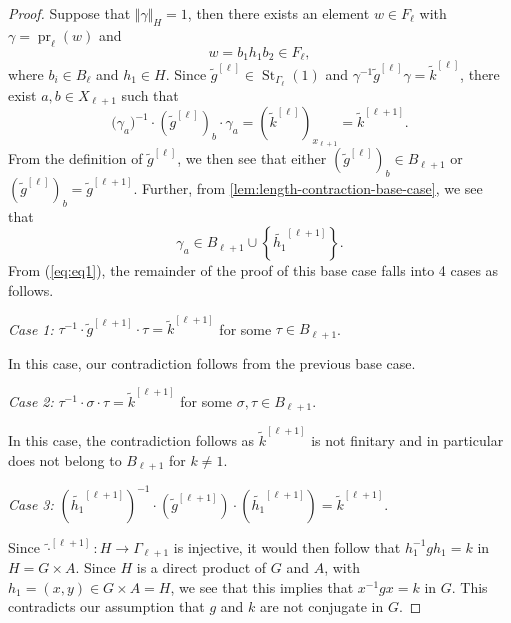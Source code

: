 \documentclass[10pt,a4paper]{amsart}
\DeclareMathOperator{\St}{St}
\DeclareMathOperator{\pr}{pr}
\newcommand{\absH}[1]{\Vert #1 \Vert_H}
\begin{document}
\begin{proof}
\nopagebreak\smallskip
\nopagebreak\noindent
Suppose that $\absH{\gamma}=1$, then there exists an element $w\in F_\ell$ with $\gamma = \pr_\ell(w)$ and
\begin{equation}\label{eq:base-case1}
    w = b_1 h_1 b_2\in F_\ell,
\end{equation}
where $b_i\in B_\ell$ and $h_1 \in H$.
Since $\widetilde{g}^{[\ell]}\in \St_{\Gamma_\ell}(1)$ and $\gamma^{-1} \widetilde{g}^{[\ell]} \gamma = \widetilde{k}^{[\ell]}$, there exist $a,b\in X_{\ell+1}$ such that
\begin{equation}\label{eq:eq1}
    \bigl(\gamma_a\bigr)^{-1}
    \cdot (\widetilde{g}^{[\ell]})_b
    \cdot \gamma_a
    =
    (\widetilde{k}^{[\ell]})_{x_{\ell+1}} = \widetilde{k}^{[\ell+1]}.
\end{equation}
From the definition of $\widetilde{g}^{[\ell]}$, we then see that either $(\widetilde{g}^{[\ell]})_b \in B_{\ell+1}$ or $(\widetilde{g}^{[\ell]})_b = \widetilde{g}^{[\ell+1]}$.
Further, from \cref{lem:length-contraction-base-case}, we see that \[\gamma_{a} \in B_{\ell+1} \cup \left\{\widetilde{h_1}^{[\ell+1]}\right\}.\]
From (\ref{eq:eq1}), the remainder of the proof of this base case falls into 4 cases as follows.

\medskip

\noindent\textit{Case 1:}
$\tau^{-1} \cdot \widetilde{g}^{[\ell+1]}\cdot \tau = \widetilde{k}^{[\ell+1]}$ for some $\tau\in B_{\ell+1}$.

\smallskip\noindent
In this case, our contradiction follows from the previous base case.

\medskip

\noindent\textit{Case 2:}
$\tau^{-1}\cdot \sigma\cdot \tau = \widetilde{k}^{[\ell+1]}$ for some $\sigma,\tau\in B_{\ell+1}$.

\smallskip\noindent
In this case, the contradiction follows as $\widetilde{k}^{[\ell+1]}$ is not finitary and in particular does not belong to $B_{\ell+1}$ for $k\neq 1$.

\medskip

\noindent\textit{Case 3:}
$(\widetilde{h_1}^{[\ell+1]})^{-1}\cdot (\widetilde{g}^{[\ell+1]})\cdot (\widetilde{h_1}^{[\ell+1]}) = \widetilde{k}^{[\ell+1]}$.

\smallskip\noindent
Since $\widetilde{\cdot}^{[\ell+1]} \colon H\to\Gamma_{\ell+1}$ is injective, it would then follow that $h_1^{-1} g h_1 = k$ in $H=G\times A$.
Since $H$ is a direct product of $G$ and $A$, with $h_1 = (x,y)\in G\times A = H$, we see that this implies that $x^{-1} g x = k$ in $G$.
This contradicts our assumption that $g$ and $k$ are not conjugate in $G$.


\end{proof}
\end{document}
